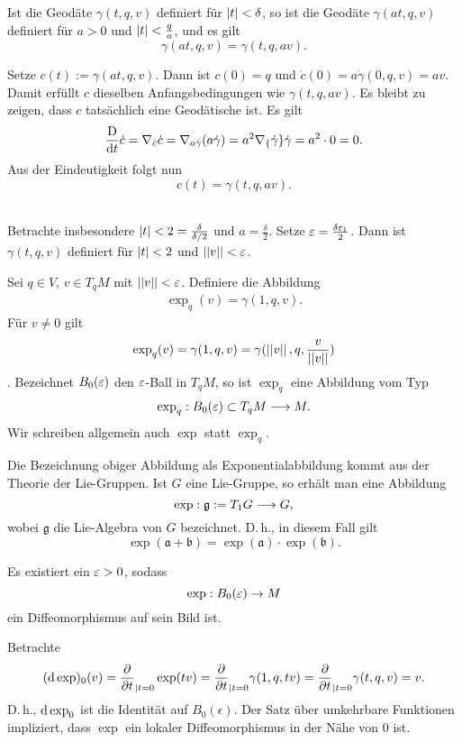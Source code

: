 Ist die Geodäte $\gamma(t,q, v)$ definiert für $\left|t\right| < \delta$, so ist die Geodäte $\gamma(at,q,v)$ definiert für $a > 0$ und $\left|t\right| < \frac{q}{a}$, und es gilt
\[ \gamma(at, q, v) = \gamma(t,q,av). \]
\begin{Beweis}{}
Setze $c(t) := \gamma(at, q,v)$. Dann ist $c(0) = q$ und $\dot{c}(0) = a \dot{\gamma}(0,q,v) = av$. Damit erfüllt $c$ dieselben Anfangsbedingungen wie $\gamma(t,q, av)$. Es bleibt zu zeigen, dass $c$ tatsächlich eine Geodätische ist. Es gilt
\[ \frac{\text{D}}{\text{d} t}\dot{c} = \nabla_{\dot{c}} \dot{c} = \nabla_{a\dot{\gamma}} (a\dot{\gamma}) = a^2 \nabla_\{\dot{\gamma}\} \dot{\gamma} = a^2 \cdot 0 = 0. \]
Aus der Eindeutigkeit folgt nun
\[ c(t) = \gamma(t,q,av). \]
\end{Beweis}\\
Betrachte insbesondere $\left|t\right| < 2 = \frac{\delta}{\delta / 2}$ und $a = \frac{\delta}{2}$. Setze $\varepsilon = \frac{\delta \varepsilon_1}{2}$. Dann ist $\gamma(t,q,v)$ definiert für $\left|t\right|<2$ und $\left|\left|v\right|\right| < \varepsilon$.

Sei $q \in V$, $v \in T_qM$ mit $\left|\left|v\right|\right| < \varepsilon$. Definiere die Abbildung
\begin{align*}
 \exp_q(v) = \gamma(1, q, v).
\end{align*}
Für $v \neq 0$ gilt
\[ \exp_q(v) = \gamma(1, q, v) = \gamma(\left|\left|v\right|\right|, q, \frac{v}{\left|\left|v\right|\right|}) \].
Bezeichnet $B_0(\varepsilon)$ den $\varepsilon$-Ball in $T_qM$, so ist $\exp_q$ eine Abbildung vom Typ
\[ \exp_q : B_0(\varepsilon) \subset T_qM \overset{}{\longrightarrow} M. \]
Wir schreiben allgemein auch $\exp$ statt $\exp_q$.

\Bem{}
Die Bezeichnung obiger Abbildung als Exponentialabbildung kommt aus der Theorie der Lie-Gruppen. Ist $G$ eine Lie-Gruppe, so erhält man eine Abbildung
\[ \exp : \mathfrak{g} := T_1G \overset{}{\longrightarrow} G, \]
wobei $\mathfrak{g}$ die Lie-Algebra von $G$ bezeichnet. D.\,h., in diesem Fall gilt
\[ \exp(\mathfrak{a} + \mathfrak{b}) = \exp(\mathfrak{a}) \cdot \exp(\mathfrak{b}). \]

\Prop{}
Es existiert ein $\varepsilon > 0$, sodass
\[ \exp : B_0(\varepsilon) \overset{}{\rightarrow} M \]
ein Diffeomorphismus auf sein Bild ist.
\begin{Beweis}{}
Betrachte
\[ (\text{d} \exp)_0(v) = \frac{\partial }{\partial t}_{| t = 0} \exp(tv) = \frac{\partial }{\partial t}_{| t = 0} \gamma(1, q, tv) =  \frac{\partial }{\partial t}_{| t = 0} \gamma(t, q, v) = v . \]
D.\,h., $\text{d} \exp_0$ ist die Identität auf $B_0(\epsilon)$. Der Satz über umkehrbare Funktionen impliziert, dass $\exp$ ein lokaler Diffeomorphismus in der Nähe von $0$ ist.
\end{Beweis}

